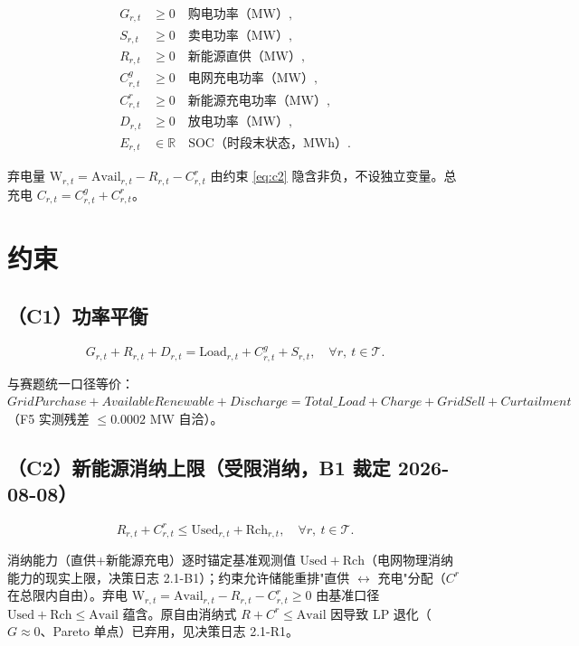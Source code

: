 \documentclass{internal-report}
\begin{document}
\begin{align}
  G_{r,t} &\ge 0\quad\text{购电功率（MW）}, \label{eq:varG}\\
  S_{r,t} &\ge 0\quad\text{卖电功率（MW）},\\
  R_{r,t} &\ge 0\quad\text{新能源直供（MW）},\\
  C^{g}_{r,t} &\ge 0\quad\text{电网充电功率（MW）},\\
  C^{r}_{r,t} &\ge 0\quad\text{新能源充电功率（MW）},\\
  D_{r,t} &\ge 0\quad\text{放电功率（MW）},\\
  E_{r,t} &\in \mathbb{R}\quad\text{SOC（时段末状态，MWh）}.
\end{align}

弃电量 $\mathrm{W}_{r,t} = \mathrm{Avail}_{r,t} - R_{r,t} - C^{r}_{r,t}$ 由约束 \eqref{eq:c2} 隐含非负，不设独立变量。总充电 $C_{r,t} = C^{g}_{r,t} + C^{r}_{r,t}$。

\section{约束}

\subsection{（C1）功率平衡}

\begin{equation}
  G_{r,t} + R_{r,t} + D_{r,t} = \mathrm{Load}_{r,t} + C^{g}_{r,t} + S_{r,t},\quad \forall r,\ t\in\mathcal{T}.
  \label{eq:c1}
\end{equation}

与赛题统一口径等价：$GridPurchase + AvailableRenewable + Discharge = Total\_Load + Charge + GridSell + Curtailment$（F5 实测残差 $\le 0.0002$ MW 自洽）。

\subsection{（C2）新能源消纳上限（受限消纳，B1 裁定 2026-08-08）}

\begin{equation}
  R_{r,t} + C^{r}_{r,t} \le \mathrm{Used}_{r,t} + \mathrm{Rch}_{r,t},\quad \forall r,\ t\in\mathcal{T}.
  \label{eq:c2}
\end{equation}

消纳能力（直供+新能源充电）逐时锚定基准观测值 $\mathrm{Used}+\mathrm{Rch}$（电网物理消纳能力的现实上限，决策日志 2.1-B1）；约束允许储能重排"直供 $\leftrightarrow$ 充电"分配（$C^r$ 在总限内自由）。弃电 $\mathrm{W}_{r,t}=\mathrm{Avail}_{r,t}-R_{r,t}-C^{r}_{r,t}\ge 0$ 由基准口径 $\mathrm{Used}+\mathrm{Rch}\le\mathrm{Avail}$ 蕴含。原自由消纳式 $R+C^r\le\mathrm{Avail}$ 因导致 LP 退化（$G\approx0$、Pareto 单点）已弃用，见决策日志 2.1-R1。
\end{document}
